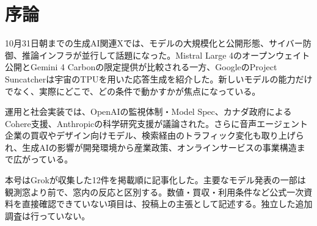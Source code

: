 \section*{序論}
10月31日朝までの生成AI関連Xでは、モデルの大規模化と公開形態、サイバー防御、推論インフラが並行して話題になった。Mistral Large 4のオープンウェイト公開とGemini 4 Carbonの限定提供が比較される一方、GoogleのProject Suncatcherは宇宙のTPUを用いた応答生成を紹介した。新しいモデルの能力だけでなく、実際にどこで、どの条件で動かすかが焦点になっている。

運用と社会実装では、OpenAIの監視体制・Model Spec、カナダ政府によるCohere支援、Anthropicの科学研究支援が議論された。さらに音声エージェント企業の買収やデザイン向けモデル、検索経由のトラフィック変化も取り上げられ、生成AIの影響が開発環境から産業政策、オンラインサービスの事業構造まで広がっている。

本号はGrokが収集した12件を掲載順に記事化した。主要なモデル発表の一部は観測窓より前で、窓内の反応と区別する。数値・買収・利用条件など公式一次資料を直接確認できていない項目は、投稿上の主張として記述する。独立した追加調査は行っていない。
